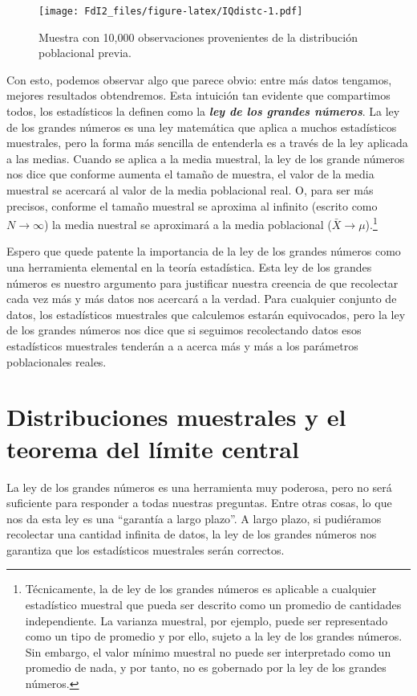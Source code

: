 \documentclass[spanish,]{book}
\let\rmarkdownfootnote\footnote%
\def\footnote{\protect\rmarkdownfootnote}
\begin{document}
\begin{figure}
\centering
\texttt{[image: FdI2\_files/figure-latex/IQdistc-1.pdf]}
\caption{\label{fig:IQdistc}Muestra con 10,000 observaciones provenientes de
la distribución poblacional previa.}
\end{figure}

Con esto, podemos observar algo que parece obvio: entre más datos
tengamos, mejores resultados obtendremos. Esta intuición tan evidente
que compartimos todos, los estadísticos la definen como la
\textbf{\emph{ley de los grandes números}}. La ley de los grandes
números es una ley matemática que aplica a muchos estadísticos
muestrales, pero la forma más sencilla de entenderla es a través de la
ley aplicada a las medias. Cuando se aplica a la media muestral, la ley
de los grande números nos dice que conforme aumenta el tamaño de
muestra, el valor de la media muestral se acercará al valor de la media
poblacional real. O, para ser más precisos, conforme el tamaño muestral
se aproxima al infinito (escrito como \(N \rightarrow \infty\)) la media
nuestral se aproximará a la media poblacional
(\(\bar{X} \rightarrow \mu\)).\footnote{Técnicamente, la de ley de los
  grandes números es aplicable a cualquier estadístico muestral que
  pueda ser descrito como un promedio de cantidades independiente. La
  varianza muestral, por ejemplo, puede ser representado como un tipo de
  promedio y por ello, sujeto a la ley de los grandes números. Sin
  embargo, el valor mínimo muestral no puede ser interpretado como un
  promedio de nada, y por tanto, no es gobernado por la ley de los
  grandes números.}

Espero que quede patente la importancia de la ley de los grandes números
como una herramienta elemental en la teoría estadística. Esta ley de los
grandes números es nuestro argumento para justificar nuestra creencia de
que recolectar cada vez más y más datos nos acercará a la verdad. Para
cualquier conjunto de datos, los estadísticos muestrales que calculemos
estarán equivocados, pero la ley de los grandes números nos dice que si
seguimos recolectando datos esos estadísticos muestrales tenderán a a
acerca más y más a los parámetros poblacionales reales.

\section{Distribuciones muestrales y el teorema del límite
central}\label{samplesandclt}

La ley de los grandes números es una herramienta muy poderosa, pero no
será suficiente para responder a todas nuestras preguntas. Entre otras
cosas, lo que nos da esta ley es una ``garantía a largo plazo''. A largo
plazo, si pudiéramos recolectar una cantidad infinita de datos, la ley
de los grandes números nos garantiza que los estadísticos muestrales
serán correctos.
\end{document}
